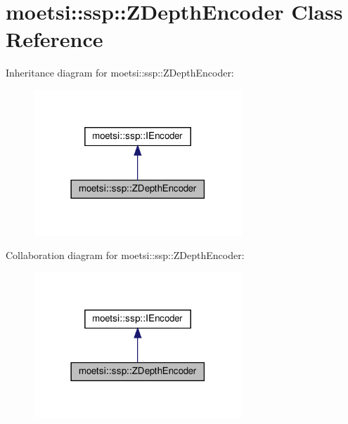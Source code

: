 \hypertarget{classmoetsi_1_1ssp_1_1ZDepthEncoder}{}\section{moetsi\+:\+:ssp\+:\+:Z\+Depth\+Encoder Class Reference}
\label{classmoetsi_1_1ssp_1_1ZDepthEncoder}


Inheritance diagram for moetsi\+:\+:ssp\+:\+:Z\+Depth\+Encoder\+:
\nopagebreak
\begin{figure}[H]
\begin{center}
\leavevmode
\includegraphics[width=222pt]{classmoetsi_1_1ssp_1_1ZDepthEncoder__inherit__graph}
\end{center}
\end{figure}


Collaboration diagram for moetsi\+:\+:ssp\+:\+:Z\+Depth\+Encoder\+:
\nopagebreak
\begin{figure}[H]
\begin{center}
\leavevmode
\includegraphics[width=222pt]{classmoetsi_1_1ssp_1_1ZDepthEncoder__coll__graph}
\end{center}
\end{figure}
